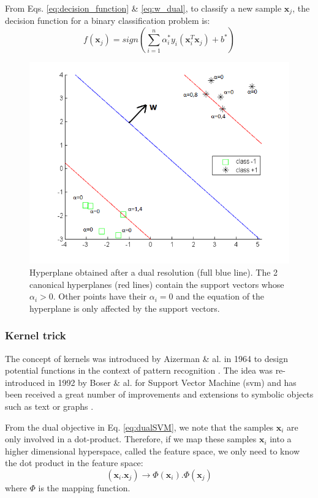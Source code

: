 \noindent From Eqs. \ref{eq:decision_function} \& \ref{eq:w_dual}, to classify a new sample $\textbf{x}_j$, the decision function for a binary classification problem is:
\begin{equation}
	f(\textbf{x}_j) = sign\left( \sum\limits_{i=1}^{n} \alpha_i^*y_i(\textbf{x}_i^T\textbf{x}_j) + b^* \right)  \label{decisionDual}
\end{equation} 

\begin{figure}[h!]
	\centering
	\includegraphics[width=0.6\linewidth]{images/SVM_SV2}
	\caption{Hyperplane obtained after a dual resolution (full blue line). The 2 canonical hyperplanes (red lines) contain the support vectors whose $\alpha_i > 0$. Other points have their $\alpha_i = 0$ and the equation of the hyperplane is only affected by the support vectors.}
	\label{fig:SVM_SV}
\end{figure}


\subsubsection{Kernel trick}
The concept of kernels was introduced by Aizerman \& al. in 1964 to design potential functions in the context of pattern recognition \cite{Aizerman1964}. The idea was re-introduced in 1992 by Boser \& al. for Support Vector Machine ({\sc svm}) and has been received a great number of improvements and extensions to symbolic objects such as text or graphs \cite{Boser1992}.

From the dual objective in Eq. \ref{eq:dualSVM}, we note that the samples $\textbf{x}_i$ are only involved in a dot-product. Therefore, if we map these samples $\textbf{x}_i$ into a higher dimensional hyperspace, called the feature space, we only need to know the dot product in the feature space:
\begin{equation}
	(\textbf{x}_i . \textbf{x}_j) \rightarrow \Phi(\textbf{x}_i) . \Phi(\textbf{x}_j) 
\end{equation}
\noindent where $\Phi$ is the mapping function. \\

